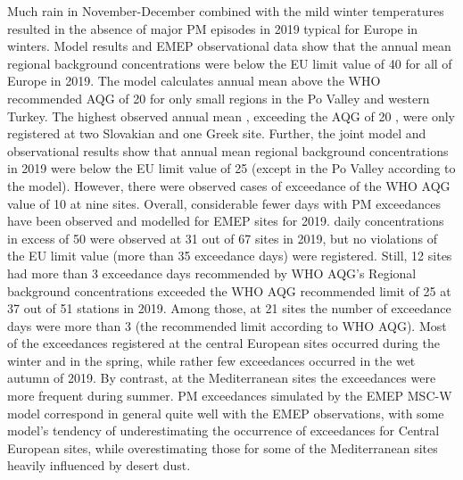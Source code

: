 Much rain in November-December combined with the mild winter temperatures resulted in the absence of major PM episodes in 2019 typical for Europe in winters. Model results and EMEP observational data show that the annual mean regional background \PM[10] concentrations were below the EU limit value of 40 \ug for all of Europe in 2019. The model calculates annual mean \PM[10] above the WHO recommended AQG of 20 \ug for only small regions in the Po Valley and western Turkey. The highest observed annual mean \PM[10], exceeding the AQG of 20 \ug, were only registered at two Slovakian and one Greek site. Further, the joint model and observational results show that annual mean regional background \PM[2.5] concentrations in 2019 were below the EU limit value of 25 \ug (except in the Po Valley according to the model). However, there were observed cases of exceedance of the WHO AQG value of 10 \ug at nine sites.
Overall, considerable fewer days with PM exceedances have been observed and modelled for EMEP sites for 2019. \PM[10] daily concentrations in excess of 50 \ug were observed at 31 out of 67 sites in 2019, but no violations of the \PM[10] EU limit value (more than 35 exceedance days) were registered. Still, 12 sites had more than 3 exceedance days recommended by WHO AQG’s %
Regional background \PM[2.5] concentrations exceeded the WHO AQG recommended limit of 25 \ug at 37 out of 51 stations in 2019. Among those, at 21 sites the number of exceedance days were more than 3 (the recommended limit according to WHO AQG).  %
Most of the exceedances registered at the central European sites occurred during the winter and in the spring, while rather few exceedances occurred in the wet autumn of 2019. By contrast, at the Mediterranean sites the exceedances were more frequent during summer. PM exceedances simulated by the EMEP MSC-W model correspond in general quite well with the EMEP observations, with some model’s tendency of underestimating the occurrence of exceedances for Central European sites, while overestimating those for some of the Mediterranean sites heavily influenced by desert dust.



